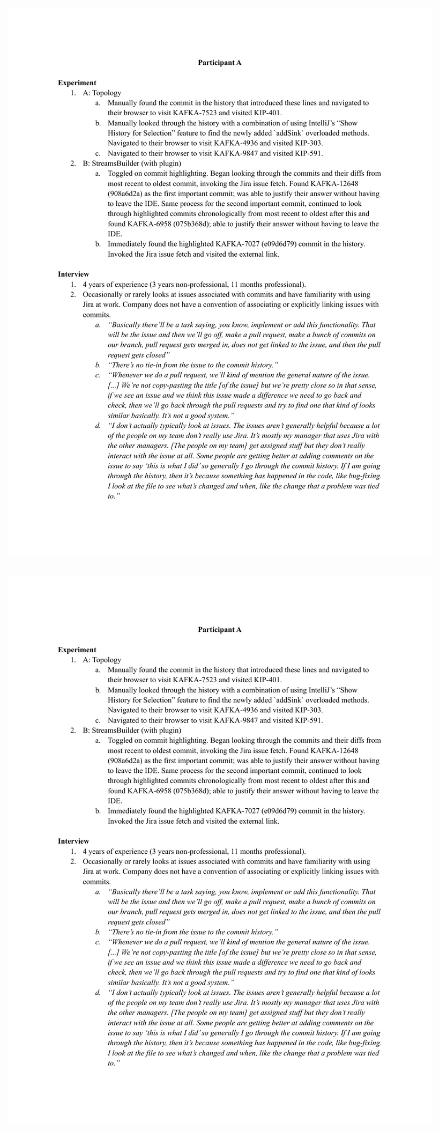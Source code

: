\begin{figure}[H]
    \includegraphics[page=19,width=\textwidth]{./files/session-summaries.pdf}
\end{figure}

\begin{figure}[H]
    \includegraphics[page=20,width=\textwidth]{./files/session-summaries.pdf}
\end{figure}

\endinput